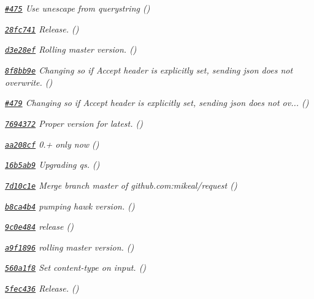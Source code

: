 \begin{DoxyItemize}
\item {\itshape \href{https://github.com/mikeal/request/pull/475}{\tt \#475} Use {\ttfamily unescape} from {\ttfamily querystring} ()}
\item {\itshape \href{https://github.com/mikeal/request/commit/28fc741fa958a9783031189964ef6f6d7e3f3264}{\tt 28fc741} Release. ()}
\item {\itshape \href{https://github.com/mikeal/request/commit/d3e28ef7144da4d9f22f8fb475bd5aa6a80fb947}{\tt d3e28ef} Rolling master version. ()}
\item {\itshape \href{https://github.com/mikeal/request/commit/8f8bb9ee8c4dcd9eb815249fbe2a7cf54f61b56f}{\tt 8f8bb9e} Changing so if Accept header is explicitly set, sending json does not overwrite. ()}
\item {\itshape \href{https://github.com/mikeal/request/pull/479}{\tt \#479} Changing so if Accept header is explicitly set, sending json does not ov... ()}
\item {\itshape \href{https://github.com/mikeal/request/commit/7694372f3dc9d57ac29ca7ee5c00146aa5e1e747}{\tt 7694372} Proper version for latest. ()}
\item {\itshape \href{https://github.com/mikeal/request/commit/aa208cf5c682262529d749f592db147182cacfaf}{\tt aa208cf} 0.+ only now ()}
\item {\itshape \href{https://github.com/mikeal/request/commit/16b5ab9151823067b05b382241483ef10811c3e1}{\tt 16b5ab9} Upgrading qs. ()}
\item {\itshape \href{https://github.com/mikeal/request/commit/7d10c1e83b4663f592c773e7fece83435585a06f}{\tt 7d10c1e} Merge branch \textquotesingle{}master\textquotesingle{} of github.\+com\+:mikeal/request ()}
\item {\itshape \href{https://github.com/mikeal/request/commit/b8ca4b474b8215cab44ef8ef789303571b3d016f}{\tt b8ca4b4} pumping hawk version. ()}
\item {\itshape \href{https://github.com/mikeal/request/commit/9c0e48430e3a9de8715e77c07c98301399eaf6e3}{\tt 9c0e484} release ()}
\item {\itshape \href{https://github.com/mikeal/request/commit/a9f189697e2a813bee9bff31de32a25e99e55cf2}{\tt a9f1896} rolling master version. ()}
\item {\itshape \href{https://github.com/mikeal/request/commit/560a1f8b927099e44b75274375a690df2a05de67}{\tt 560a1f8} Set content-\/type on input. ()}
\item {\itshape \href{https://github.com/mikeal/request/commit/5fec436b6602bc8c76133664bca23e98f511b096}{\tt 5fec436} Release. ()}

\end{DoxyItemize}
